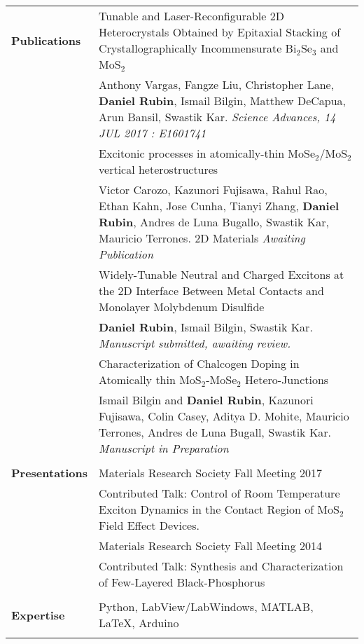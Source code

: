 \documentclass{article}
\begin{document}
\begin{center}
\begin{tabularx}{\linewidth}{>{\raggedright\bf\large{}}p{3.0cm}X}
Publications & \large{ Tunable and Laser-Reconfigurable 2D Heterocrystals Obtained by Epitaxial Stacking of Crystallographically Incommensurate Bi$_{2}$Se$_{3}$ and MoS$_{2}$}\\
 & Anthony Vargas, Fangze Liu,  Christopher Lane, {\bf Daniel Rubin}, Ismail Bilgin, Matthew DeCapua, Arun Bansil, Swastik Kar. {\it  Science Advances, 14 JUL 2017 : E1601741}\\
 \rule{0pt}{0.5cm}   & \large{Excitonic processes in atomically-thin MoSe$_2$/MoS$_2$ vertical heterostructures}\\
 & Victor Carozo, Kazunori Fujisawa, Rahul Rao, Ethan Kahn, Jose Cunha, Tianyi Zhang, {\bf Daniel Rubin}, Andres de Luna Bugallo, Swastik Kar, Mauricio Terrones. 2D Materials {\it Awaiting Publication}\\
 \rule{0pt}{0.5cm}   & \large{Widely-Tunable Neutral and Charged Excitons at the 2D Interface Between Metal Contacts and Monolayer Molybdenum Disulfide}\\
 & {\bf Daniel Rubin}, Ismail Bilgin, Swastik Kar. {\it Manuscript submitted, awaiting review.}\\
\rule{0pt}{0.5cm}  & \large{Characterization of Chalcogen Doping in Atomically thin MoS$_{2}$-MoSe$_{2}$ Hetero-Junctions}\\
 & Ismail Bilgin and {\bf Daniel Rubin}, Kazunori Fujisawa, Colin Casey, Aditya D. Mohite, Mauricio Terrones, Andres de Luna Bugall, Swastik Kar. \it{Manuscript in Preparation}\\
 & \\ %
 
Presentations & {\large Materials Research Society Fall Meeting 2017}\\
 & Contributed Talk: Control of Room Temperature Exciton Dynamics in the Contact Region of MoS$_2$ Field Effect Devices.\\
 & {\large Materials Research Society Fall Meeting 2014}\\
 & Contributed Talk: Synthesis and Characterization of Few-Layered Black-Phosphorus \\
 & \\ %


Expertise & Python, LabView/LabWindows, MATLAB, \LaTeX, Arduino\\
 & \\ %

\end{tabularx}
\end{center}
\end{document}
